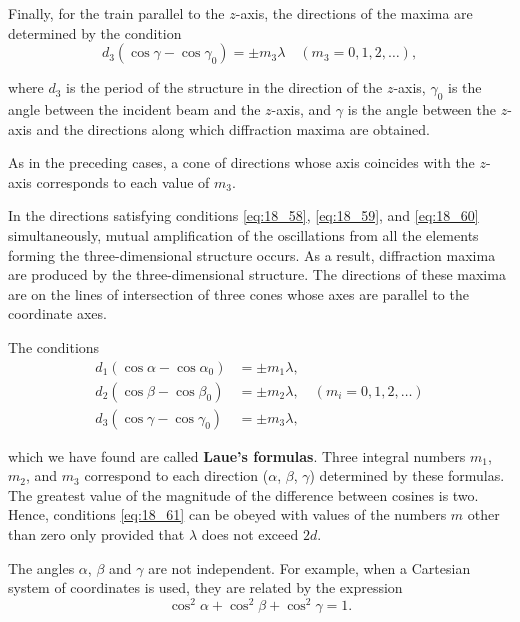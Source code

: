 Finally, for the train parallel to the $z$-axis, the directions of the maxima are determined by the condition
\begin{equation}\label{eq:18_60}
	d_3 (\cos\gamma - \cos\gamma_0) = \pm m_3 \lambda \quad (m_3=0,1,2,\ldots),
\end{equation}

\noindent
where $d_3$ is the period of the structure in the direction of the $z$-axis, $\gamma_0$ is the angle between the incident beam and the $z$-axis, and $\gamma$ is the angle between the $z$-axis and the directions along which diffraction maxima are obtained.

As in the preceding cases, a cone of directions whose axis coincides with the $z$-axis corresponds to each value of $m_3$.

In the directions satisfying conditions \eqref{eq:18_58}, \eqref{eq:18_59}, and \eqref{eq:18_60} simultaneously, mutual amplification of the oscillations from all the elements forming the three-dimensional structure occurs.
As a result, diffraction maxima are produced by the three-dimensional structure.
The directions of these maxima are on the lines of intersection of three cones whose axes are parallel to the coordinate axes.

The conditions
\begin{align}
		d_1 (\cos\alpha - \cos\alpha_0) &= \pm m_1 \lambda, \nonumber\\
		d_2 (\cos\beta - \cos\beta_0) &= \pm m_2 \lambda, \quad (m_i=0,1,2,\ldots) \label{eq:18_61}\\
		d_3 (\cos\gamma - \cos\gamma_0) &= \pm m_3 \lambda, \nonumber
\end{align}

\noindent
which we have found are called \textbf{Laue's formulas}.
Three integral numbers $m_1$, $m_2$, and $m_3$ correspond to each direction ($\alpha$, $\beta$, $\gamma$) determined by these formulas.
The greatest value of the magnitude of the difference between cosines is two.
Hence, conditions \eqref{eq:18_61} can be obeyed with values of the numbers $m$ other than zero only provided that $\lambda$ does not exceed $2d$.

The angles $\alpha$, $\beta$ and $\gamma$ are not independent.
For example, when a Cartesian system of coordinates is used, they are related by the expression
\begin{equation}\label{eq:18_62}
	\cos^2\alpha + \cos^2\beta + \cos^2\gamma = 1.
\end{equation}


